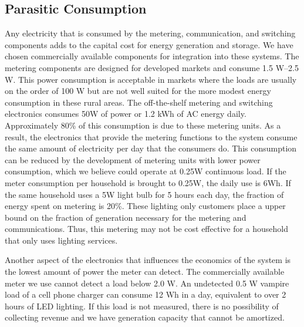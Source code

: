 \documentclass{sig-alternate}
\begin{document}
\subsection{Parasitic Consumption}
Any electricity that is consumed by the metering, communication, and 
switching components adds to the capital cost for energy generation and 
storage.
We have chosen commercially available components for integration into
these systems.  
The metering components are designed for developed markets
and consume 1.5 W--2.5 W.  
This power consumption is acceptable in markets where the loads are 
usually on the order of 100 W but are not well suited for the more modest
energy consumption in these rural areas.  
The off-the-shelf metering and switching electronics consumes 50W of power
or 1.2 kWh of AC energy daily.  
Approximately 80\% of this consumption is due to these metering units.
As a result, the electronics that provide the metering functions to the 
system consume the same amount of electricity per day that the consumers do.
This consumption can be reduced by the development of metering units with
lower power consumption, which we believe could operate at 0.25W 
continuous load.
If the meter consumption per household is brought to 0.25W, the daily
use is 6Wh.
If the same household uses a 5W light bulb for 5 hours each day, the fraction
of energy spent on metering is 20\%.
These lighting only customers place a upper bound on the fraction of generation
necessary for the metering and communications. 
Thus, this metering may not be cost effective for a household that only
uses lighting services.

Another aspect of the electronics that influences the economics of the system
is the lowest amount of power the meter can detect.
The commercially available meter we use cannot detect a load below 2.0 W.
An undetected 0.5 W vampire load of a
cell phone charger can consume 12 Wh in a day, equivalent to over 2 hours
of LED lighting.  
If this load is not measured, there
is no possibility of collecting revenue and we have generation capacity
that cannot be amortized.  
\end{document}
